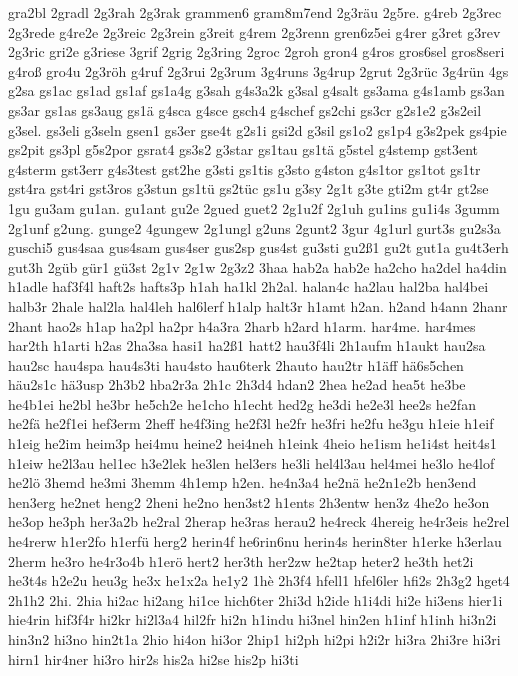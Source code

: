 {gra2bl
2gradl
2g3rah
2g3rak
grammen6
gram8m7end
2g3räu
2g5re.
g4reb
2g3rec
2g3rede
g4re2e
2g3reic
2g3rein
g3reit
g4rem
2g3renn
gren6z5ei
g4rer
g3ret
g3rev
2g3ric
gri2e
g3riese
3grif
2grig
2g3ring
2groc
2groh
gron4
g4ros
gros6sel
gros8seri
g4roß
gro4u
2g3röh
g4ruf
2g3rui
2g3rum
3g4runs
3g4rup
2grut
2g3rüc
3g4rün
4gs
g2sa
gs1ac
gs1ad
gs1af
gs1a4g
g3sah
g4s3a2k
g3sal
g4salt
gs3ama
g4s1amb
gs3an
gs3ar
gs1as
gs3aug
gs1ä
g4sca
g4sce
gsch4
g4schef
gs2chi
gs3cr
g2s1e2
g3s2eil
g3sel.
gs3eli
g3seln
gsen1
gs3er
gse4t
g2s1i
gsi2d
g3sil
gs1o2
gs1p4
g3s2pek
gs4pie
gs2pit
gs3pl
g5s2por
gsrat4
gs3s2
g3star
gs1tau
gs1tä
g5stel
g4stemp
gst3ent
g4sterm
gst3err
g4s3test
gst2he
g3sti
gs1tis
g3sto
g4ston
g4s1tor
gs1tot
gs1tr
gst4ra
gst4ri
gst3ros
g3stun
gs1tü
gs2tüc
gs1u
g3sy
2g1t
g3te
gti2m
gt4r
gt2se
1gu
gu3am
gu1an.
gu1ant
gu2e
2gued
guet2
2g1u2f
2g1uh
gu1ins
gu1i4s
3gumm
2g1unf
g2ung.
gunge2
4gungew
2g1ungl
g2uns
2gunt2
3gur
4g1url
gurt3s
gu2s3a
guschi5
gus4saa
gus4sam
gus4ser
gus2sp
gus4st
gu3sti
gu2ß1
gu2t
gut1a
gu4t3erh
gut3h
2güb
gür1
gü3st
2g1v
2g1w
2g3z2
3haa
hab2a
hab2e
ha2cho
ha2del
ha4din
h1adle
haf3f4l
haft2s
hafts3p
h1ah
ha1kl
2h2al.
halan4c
ha2lau
hal2ba
hal4bei
halb3r
2hale
hal2la
hal4leh
hal6lerf
h1alp
halt3r
h1amt
h2an.
h2and
h4ann
2hanr
2hant
hao2s
h1ap
ha2pl
ha2pr
h4a3ra
2harb
h2ard
h1arm.
har4me.
har4mes
har2th
h1arti
h2as
2ha3sa
hasi1
ha2ß1
hatt2
hau3f4li
2h1aufm
h1aukt
hau2sa
hau2sc
hau4spa
hau4s3ti
hau4sto
hau6terk
2hauto
hau2tr
h1äff
hä6s5chen
häu2s1c
hä3usp
2h3b2
hba2r3a
2h1c
2h3d4
hdan2
2hea
he2ad
hea5t
he3be
he4b1ei
he2bl
he3br
he5ch2e
he1cho
h1echt
hed2g
he3di
he2e3l
hee2s
he2fan
he2fä
he2f1ei
hef3erm
2heff
he4f3ing
he2f3l
he2fr
he3fri
he2fu
he3gu
h1eie
h1eif
h1eig
he2im
heim3p
hei4mu
heine2
hei4neh
h1eink
4heio
he1ism
he1i4st
heit4s1
h1eiw
he2l3au
hel1ec
h3e2lek
he3len
hel3ers
he3li
hel4l3au
hel4mei
he3lo
he4lof
he2lö
3hemd
he3mi
3hemm
4h1emp
h2en.
he4n3a4
he2nä
he2n1e2b
hen3end
hen3erg
he2net
heng2
2heni
he2no
hen3st2
h1ents
2h3entw
hen3z
4he2o
he3on
he3op
he3ph
her3a2b
he2ral
2herap
he3ras
herau2
he4reck
4hereig
he4r3eis
he2rel
he4rerw
h1er2fo
h1erfü
herg2
herin4f
he6rin6nu
herin4s
herin8ter
h1erke
h3erlau
2herm
he3ro
he4r3o4b
h1erö
hert2
her3th
her2zw
he2tap
heter2
he3th
het2i
he3t4s
h2e2u
heu3g
he3x
he1x2a
he1y2
1hè
2h3f4
hfell1
hfel6ler
hfi2s
2h3g2
hget4
2h1h2
2hi.
2hia
hi2ac
hi2ang
hi1ce
hich6ter
2hi3d
h2ide
h1i4di
hi2e
hi3ens
hier1i
hie4rin
hif3f4r
hi2kr
hi2l3a4
hil2fr
hi2n
h1indu
hi3nel
hin2en
h1inf
h1inh
hi3n2i
hin3n2
hi3no
hin2t1a
2hio
hi4on
hi3or
2hip1
hi2ph
hi2pi
h2i2r
hi3ra
2hi3re
hi3ri
hirn1
hir4ner
hi3ro
hir2s
his2a
hi2se
his2p
hi3ti
}
